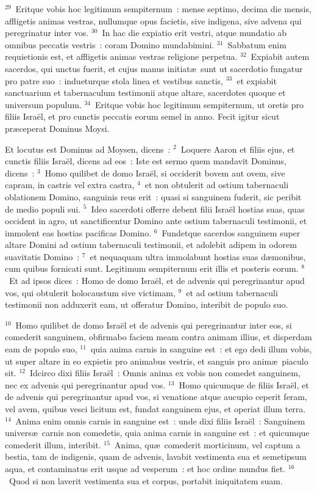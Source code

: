 ${}^{29}$~Eritque vobis hoc legitimum sempiternum~: mense septimo, decima die mensis, affligetis animas vestras, nullumque opus facietis, sive indigena, sive advena qui peregrinatur inter vos.
${}^{30}$~In hac die expiatio erit vestri, atque mundatio ab omnibus peccatis vestris~: coram Domino mundabimini.
${}^{31}$~Sabbatum enim requietionis est, et affligetis animas vestras religione perpetua.
${}^{32}$~Expiabit autem sacerdos, qui unctus fuerit, et cujus manus initiat\ae\ sunt ut sacerdotio fungatur pro patre suo~: indueturque stola linea et vestibus sanctis,
${}^{33}$~et expiabit sanctuarium et tabernaculum testimonii atque altare, sacerdotes quoque et universum populum.
${}^{34}$~Eritque vobis hoc legitimum sempiternum, ut oretis pro filiis Isra\"el, et pro cunctis peccatis eorum semel in anno. Fecit igitur sicut pr\ae ceperat Dominus Moysi.

\lettrine[lines=3,image=true,loversize=0.05,lraise=-0.03]{E}{}t locutus est Dominus ad Moysen, dicens~:
${}^{2}$~Loquere Aaron et filiis ejus, et cunctis filiis Isra\"el, dicens ad eos~: Iste est sermo quem mandavit Dominus, dicens~:
${}^{3}$~Homo quilibet de domo Isra\"el, si occiderit bovem aut ovem, sive capram, in castris vel extra castra,
${}^{4}$~et non obtulerit ad ostium tabernaculi oblationem Domino, sanguinis reus erit~: quasi si sanguinem fuderit, sic peribit de medio populi sui.
${}^{5}$~Ideo sacerdoti offerre debent filii Isra\"el hostias suas, quas occident in agro, ut sanctificentur Domino ante ostium tabernaculi testimonii, et immolent eas hostias pacificas Domino.
${}^{6}$~Fundetque sacerdos sanguinem super altare Domini ad ostium tabernaculi testimonii, et adolebit adipem in odorem suavitatis Domino~:
${}^{7}$~et nequaquam ultra immolabunt hostias suas d\ae monibus, cum quibus fornicati sunt. Legitimum sempiternum erit illis et posteris eorum.
${}^{8}$~Et ad ipsos dices~: Homo de domo Isra\"el, et de advenis qui peregrinantur apud vos, qui obtulerit holocaustum sive victimam,
${}^{9}$~et ad ostium tabernaculi testimonii non adduxerit eam, ut offeratur Domino, interibit de populo suo.


${}^{10}$~Homo quilibet de domo Isra\"el et de advenis qui peregrinantur inter eos, si comederit sanguinem, obfirmabo faciem meam contra animam illius, et disperdam eam de populo suo,
${}^{11}$~quia anima carnis in sanguine est~: et ego dedi illum vobis, ut super altare in eo expietis pro animabus vestris, et sanguis pro anim\ae\ piaculo sit.
${}^{12}$~Idcirco dixi filiis Isra\"el~: Omnis anima ex vobis non comedet sanguinem, nec ex advenis qui peregrinantur apud vos.
${}^{13}$~Homo quicumque de filiis Isra\"el, et de advenis qui peregrinantur apud vos, si venatione atque aucupio ceperit feram, vel avem, quibus vesci licitum est, fundat sanguinem ejus, et operiat illum terra.
${}^{14}$~Anima enim omnis carnis in sanguine est~: unde dixi filiis Isra\"el~: Sanguinem univers\ae\ carnis non comedetis, quia anima carnis in sanguine est~: et quicumque comederit illum, interibit.
${}^{15}$~Anima, qu\ae\ comederit morticinum, vel captum a bestia, tam de indigenis, quam de advenis, lavabit vestimenta sua et semetipsum aqua, et contaminatus erit usque ad vesperum~: et hoc ordine mundus fiet.
${}^{16}$~Quod si non laverit vestimenta sua et corpus, portabit iniquitatem suam.

